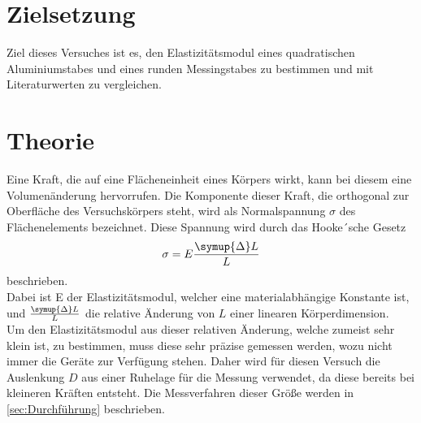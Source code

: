 \section{Zielsetzung}
\label{sec:Zielsetzung}
Ziel dieses Versuches ist es, den Elastizitätsmodul eines quadratischen Aluminiumstabes und eines runden Messingstabes zu bestimmen und mit Literaturwerten zu vergleichen.
\section{Theorie}
\label{sec:Theorie}
Eine Kraft, die auf eine Flächeneinheit eines Körpers wirkt, kann bei diesem eine Volumenänderung hervorrufen.
Die Komponente dieser Kraft, die orthogonal zur Oberfläche des Versuchskörpers steht, wird als Normalspannung $\sigma$ des Flächenelements bezeichnet.
Diese Spannung wird durch das Hooke´sche Gesetz
\begin{equation*}
    \sigma = E\frac{\symup{\Delta}L}{L}
\end{equation*}
beschrieben. \\
Dabei ist E der Elastizitätsmodul, welcher eine materialabhängige Konstante ist, und $\frac{\symup{\Delta}L}{L}$
die relative Änderung von $L$ einer linearen Körperdimension. \\
Um den Elastizitätsmodul aus dieser relativen Änderung, welche zumeist sehr klein ist, zu bestimmen,
muss diese sehr präzise gemessen werden, wozu nicht immer die Geräte zur Verfügung stehen. Daher wird für diesen Versuch die Auslenkung $D$ aus einer Ruhelage
für die Messung verwendet, da diese bereits bei kleineren Kräften entsteht. Die Messverfahren dieser Größe werden in \autoref{sec:Durchführung} beschrieben.
